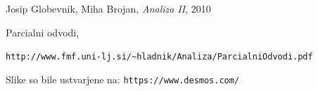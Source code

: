 \documentclass[12pt, a4paper]{article}
\begin{document}
\begin{thebibliography}{99}
Josip Globevnik, Miha Brojan, \textit{Analiza II}, 2010

Parcialni odvodi,

\verb|http://www.fmf.uni-lj.si/~hladnik/Analiza/ParcialniOdvodi.pdf|

Slike so bile ustvarjene na:
\verb|https://www.desmos.com/|

\end{thebibliography}









\end{document}
